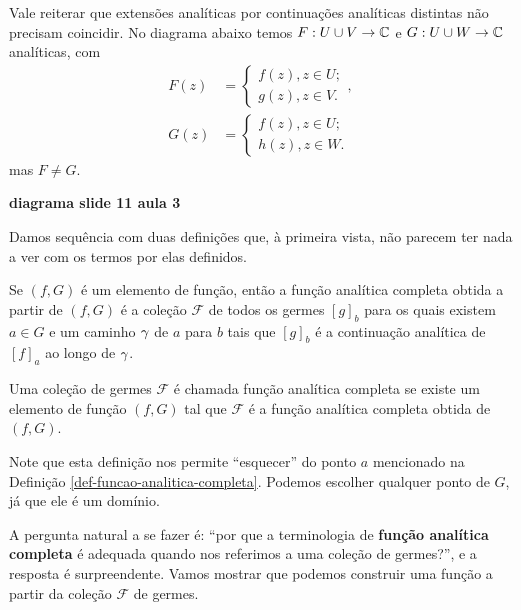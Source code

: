\begin{observacao}
        Vale reiterar que extensões analíticas por continuações analíticas distintas
        não precisam coincidir. No diagrama abaixo temos $F: U\cup V\to\mathbb{C}$
        e $G:U\cup W\to\mathbb{C}$ analíticas, com
        \begin{align*}
            F(z) &= 
            \begin{cases}
                f(z), z\in U; \\
                g(z), z\in V.
            \end{cases}, \\
            G(z) &= 
            \begin{cases}
                f(z), z\in U; \\
                h(z), z\in W.
            \end{cases}
        \end{align*}
        mas $F\neq G$.
        \begin{center}
            \textbf{diagrama slide 11 aula 3}
        \end{center}
    \end{observacao}

    Damos sequência com duas definições que, à primeira vista, não parecem ter 
    nada a ver com os termos por elas definidos.

    \begin{definicao}
    \label{def-funcao-analitica-completa}
        Se $(f,G)$ é um elemento de função, então a função analítica completa obtida
        a partir de $(f,G)$ é a coleção $\mathcal{F}$ de todos os germes $[g]_b$ 
        para os quais existem $a\in G$ e um caminho $\gamma$ de $a$ para $b$ 
        tais que $[g]_b$ é a continuação analítica de $[f]_a$ ao longo de $\gamma$.
    \end{definicao}


    \begin{definicao}
        Uma coleção de germes $\mathcal{F}$ é chamada função analítica completa se
        existe um elemento de função $(f,G)$ tal que $\mathcal{F}$ é a função analítica
        completa obtida de $(f,G)$.
    \end{definicao}

    Note que esta definição nos permite ``esquecer'' do ponto $a$ mencionado na
    Definição \ref{def-funcao-analitica-completa}. Podemos escolher qualquer ponto
    de $G$, já que ele é um domínio.

    A pergunta natural a se fazer é: ``por que a terminologia de 
    \textbf{função analítica completa} é adequada quando nos referimos a uma
    coleção de germes?'', e a resposta é surpreendente. Vamos mostrar que
    podemos construir uma função a partir da coleção $\mathcal{F}$ de germes.

